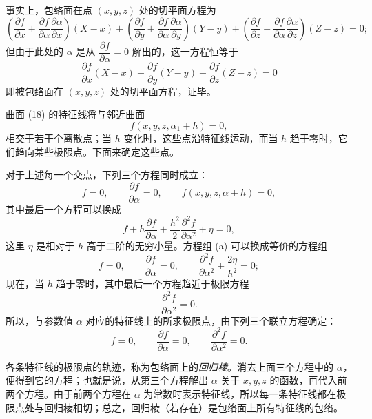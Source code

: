 事实上，包络面在点 \((x,y,z)\) 处的切平面方程为
\[
\left(\frac{\partial f}{\partial x}+\frac{\partial f}{\partial\alpha}\frac{\partial\alpha}{\partial x}\right)(X-x)+
\left(\frac{\partial f}{\partial y}+\frac{\partial f}{\partial\alpha}\frac{\partial\alpha}{\partial y}\right)(Y-y)+
\left(\frac{\partial f}{\partial z}+\frac{\partial f}{\partial\alpha}\frac{\partial\alpha}{\partial z}\right)(Z-z)=0;
\]
但由于此处的 \(\alpha\) 是从 \(\dfrac{\partial f}{\partial\alpha}=0\) 解出的，这一方程恒等于
\[
\frac{\partial f}{\partial x}(X-x)+\frac{\partial f}{\partial y}(Y-y)+\frac{\partial f}{\partial z}(Z-z)=0
\]
即被包络面在 \((x,y,z)\) 处的切平面方程，证毕。

曲面 (18) 的特征线将与邻近曲面
\[
f(x,y,z,\alpha_1+h)=0,
\]
相交于若干个离散点；当 \(h\) 变化时，这些点沿特征线运动，而当 \(h\) 趋于零时，它们趋向某些极限点。下面来确定这些点。

对于上述每一个交点，下列三个方程同时成立：
\begin{equation}\tag{a}
f=0,
\qquad
\frac{\partial f}{\partial\alpha}=0,
\qquad
f(x,y,z,\alpha+h)=0,
\end{equation}
其中最后一个方程可以换成
\[
f+h\frac{\partial f}{\partial\alpha}+\frac{h^2}{2}\frac{\partial^2 f}{\partial\alpha^2}+\eta=0,
\]
这里 \(\eta\) 是相对于 \(h\) 高于二阶的无穷小量。方程组 (a) 可以换成等价的方程组
\[
f=0,
\qquad
\frac{\partial f}{\partial\alpha}=0,
\qquad
\frac{\partial^2 f}{\partial\alpha^2}+\frac{2\eta}{h^2}=0;
\]
现在，当 \(h\) 趋于零时，其中最后一个方程趋近于极限方程
\[
\frac{\partial^2 f}{\partial\alpha^2}=0.
\]
所以，与参数值 \(\alpha\) 对应的特征线上的所求极限点，由下列三个联立方程确定：
\[
f=0,
\qquad
\frac{\partial f}{\partial\alpha}=0,
\qquad
\frac{\partial^2 f}{\partial\alpha^2}=0.
\]

各条特征线的极限点的轨迹，称为包络面上的\emph{回归棱}。消去上面三个方程中的 \(\alpha\)，便得到它的方程；也就是说，从第三个方程解出 \(\alpha\) 关于 \(x,y,z\) 的函数，再代入前两个方程。由于前两个方程在 \(\alpha\) 为常数时表示特征线，所以每一条特征线都在极限点处与回归棱相切；总之，回归棱（若存在）是包络面上所有特征线的包络。
